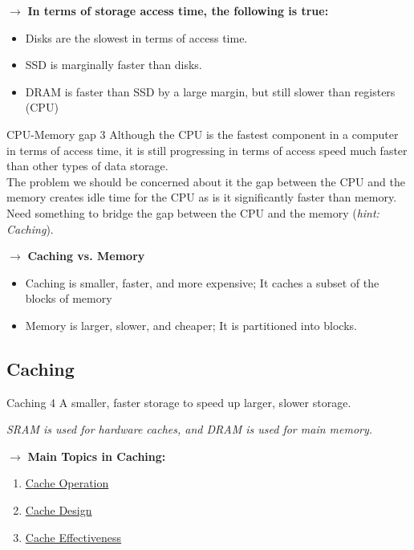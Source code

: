 \documentclass{report}
\begin{document}
$\to$ \textbf{In terms of storage access time, the following is true:} 
\begin{itemize}
  \item Disks are the slowest in terms of access time. 
  \item SSD is marginally faster than disks. 
  \item DRAM is faster than SSD by a large margin, but still slower than registers (CPU) 
\end{itemize}

\begin{definition} {CPU-Memory gap} { 3 }
  Although the CPU is the fastest component in a computer in terms of access time, it is still progressing in terms of access speed much faster than other types of data storage. \\
  
  The problem we should be concerned about it the gap between the CPU and the memory creates idle time for the CPU as is it significantly faster than memory. \\

  Need something to bridge the gap between the CPU and the memory (\emph{hint: Caching}).

\end{definition} 

$\to$ \textbf{Caching vs. Memory} 
\begin{itemize}
  \item Caching is smaller, faster, and more expensive; It caches a subset of the blocks of memory
  \item Memory is larger, slower, and cheaper; It is partitioned into blocks. 
\end{itemize}

\subsection{Caching}

\begin{definition} {Caching} { 4 }
  A smaller, faster storage to speed up larger, slower storage. \\
  \begin{note}
    \emph{SRAM is used for hardware caches, and DRAM is used for main memory.}
  \end{note} 
\end{definition}
  $\to$ \textbf{Main Topics in Caching: }
  \begin{enumerate}
    \item \underline{Cache Operation} 
    \item \underline{Cache Design} 
    \item \underline{Cache Effectiveness}  
  \end{enumerate}
\end{document}
